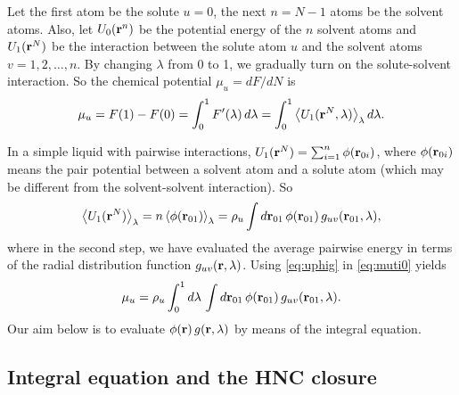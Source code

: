\documentclass{article}
\begin{document}
Let the first atom be the solute $u = 0$,
  the next $n = N - 1$ atoms be the solvent atoms.
Also,
  let $U_0(\mathbf{r}^n)$ be the potential energy of the $n$ solvent atoms
  and $U_1(\mathbf{r}^N)$ be the interaction between the solute atom $u$
  and the solvent atoms $v = 1, 2, \dots, n$.
By changing $\lambda$ from 0 to 1, we gradually turn on
  the solute-solvent interaction.
%
So the chemical potential $\mu_u = dF/dN$ is
\begin{align}
  \mu_u
  =
  F(1) - F(0)
  =
  \int_0^1 F'(\lambda) \, d\lambda
  =
  \int_0^1
    \left\langle
      U_1(\mathbf{r}^N, \lambda)
    \right\rangle_\lambda d\lambda.
  \label{eq:muti0}
\end{align}




In a simple liquid with pairwise interactions,
  $U_1(\mathbf{r}^N) = \sum_{i = 1}^{n} \phi(\mathbf{r}_{0i})$,
  where $\phi(\mathbf{r}_{0i})$ means the pair potential
  between a solvent atom and a solute atom
  (which may be different from the solvent-solvent
  interaction).
So
\begin{equation}
    \left\langle
      U_1(\mathbf{r}^N)
    \right\rangle_\lambda
    =
    n
    \left\langle
      \phi(\mathbf{r}_{01})
    \right\rangle_\lambda
    =
    \rho_u \int d\mathbf{r}_{01} \,
      \phi(\mathbf{r}_{01}) \, g_{uv}(\mathbf{r}_{01}, \lambda),
  \label{eq:uphig}
\end{equation}
%
where in the second step, we have evaluated the average
pairwise energy in terms of the radial distribution function
$g_{uv}(\mathbf{r}, \lambda)$.
Using \eqref{eq:uphig} in \eqref{eq:muti0} yields
\begin{equation}
    \mu_u
    =
    \rho_u
    \int_0^1 d\lambda \,
      \int d\mathbf{r}_{01} \,
        \phi(\mathbf{r}_{01}) \, g_{uv}(\mathbf{r}_{01}, \lambda).
  \label{eq:muti}
\end{equation}
Our aim below is to evaluate
$\phi(\mathbf{r}) \, g(\mathbf{r}, \lambda)$
by means of the integral equation.



\subsection{Integral equation and the HNC closure}
\end{document}
